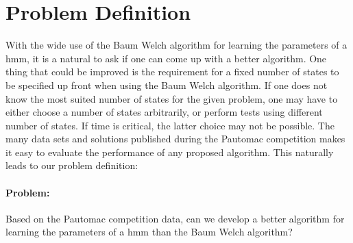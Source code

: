 \section{Problem Definition}

With the wide use of the Baum Welch algorithm for learning the parameters of a \gls{hmm}, it is a natural to ask if one can come up with a better algorithm. One thing that could be improved is the requirement for a fixed number of states to be specified up front when using the Baum Welch algorithm.
If one does not know the most suited number of states for the given problem, one may have to either choose a number of states arbitrarily, or perform tests using different number of states. If time is critical, the latter choice may not be possible.
The many data sets and solutions published during the Pautomac competition makes it easy to evaluate the performance of any proposed algorithm.
This naturally leads to our problem definition:

\paragraph{Problem:}

Based on the Pautomac competition data, can we develop a better algorithm for learning the parameters of a \gls{hmm} than the Baum Welch algorithm?
